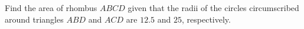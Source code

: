 Find the area of rhombus $ABCD$ given that the radii of the circles circumscribed around triangles $ABD$ and $ACD$ are $12.5$ and $25$, respectively.
